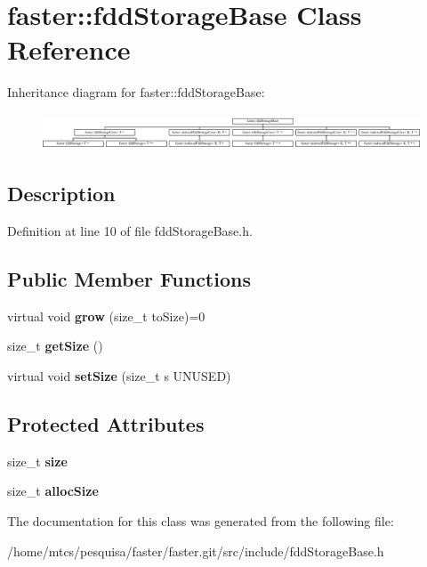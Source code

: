 \hypertarget{classfaster_1_1fddStorageBase}{}\section{faster\+:\+:fdd\+Storage\+Base Class Reference}
\label{classfaster_1_1fddStorageBase}
Inheritance diagram for faster\+:\+:fdd\+Storage\+Base\+:\begin{figure}[H]
\begin{center}
\leavevmode
\includegraphics[height=1.093750cm]{classfaster_1_1fddStorageBase}
\end{center}
\end{figure}


\subsection{Description}


Definition at line 10 of file fdd\+Storage\+Base.\+h.

\subsection*{Public Member Functions}
\begin{DoxyCompactItemize}
\item 
\hypertarget{classfaster_1_1fddStorageBase_a8052833a8e5c933d14370c0c3ed6bdeb}{}\label{classfaster_1_1fddStorageBase_a8052833a8e5c933d14370c0c3ed6bdeb} 
virtual void {\bfseries grow} (size\+\_\+t to\+Size)=0
\item 
\hypertarget{classfaster_1_1fddStorageBase_adfcf6d4431323da59cebc65702dbb079}{}\label{classfaster_1_1fddStorageBase_adfcf6d4431323da59cebc65702dbb079} 
size\+\_\+t {\bfseries get\+Size} ()
\item 
\hypertarget{classfaster_1_1fddStorageBase_aa71da7a3babbd344210d1fcbb7b5e3dc}{}\label{classfaster_1_1fddStorageBase_aa71da7a3babbd344210d1fcbb7b5e3dc} 
virtual void {\bfseries set\+Size} (size\+\_\+t s U\+N\+U\+S\+ED)
\end{DoxyCompactItemize}
\subsection*{Protected Attributes}
\begin{DoxyCompactItemize}
\item 
\hypertarget{classfaster_1_1fddStorageBase_a02c7538275a50f7dd83330acc631a603}{}\label{classfaster_1_1fddStorageBase_a02c7538275a50f7dd83330acc631a603} 
size\+\_\+t {\bfseries size}
\item 
\hypertarget{classfaster_1_1fddStorageBase_a474fed6198e4bc7c41cdb2d464bb77ec}{}\label{classfaster_1_1fddStorageBase_a474fed6198e4bc7c41cdb2d464bb77ec} 
size\+\_\+t {\bfseries alloc\+Size}
\end{DoxyCompactItemize}


The documentation for this class was generated from the following file\+:\begin{DoxyCompactItemize}
\item 
/home/mtcs/pesquisa/faster/faster.\+git/src/include/fdd\+Storage\+Base.\+h\end{DoxyCompactItemize}
